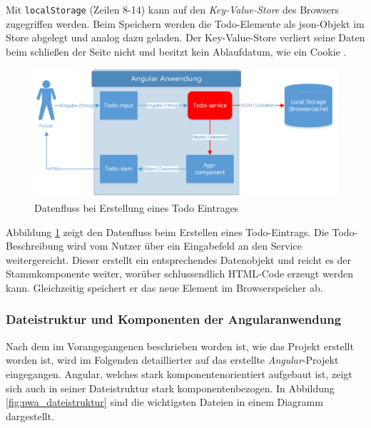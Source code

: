 Mit \texttt{localStorage} (Zeilen 8-14) kann auf den\textit{ Key-Value-Store} des Browsers zugegriffen werden. Beim Speichern werden die Todo-Elemente als \ac{json}-Objekt im Store abgelegt und analog dazu geladen. Der Key-Value-Store verliert seine Daten beim schließen der Seite nicht und besitzt kein Ablaufdatum, wie ein Cookie \cite{LocalStorage}.

\begin{figure}[h]
	\includegraphics[width=\textwidth]{img/pwa_datenfluss_erstellen.png}
	\centering
	\caption{Datenfluss bei Erstellung eines Todo Eintrages}
	\label{fig:pwa_datenfluss_erstellen}
\end{figure}

Abbildung \ref{fig:pwa_datenfluss_erstellen} zeigt den Datenfluss beim Erstellen eines Todo-Eintrags. Die Todo-Beschreibung wird vom Nutzer über ein Eingabefeld an den Service weitergereicht. Dieser erstellt ein entsprechendes Datenobjekt und reicht es der Stammkomponente weiter, worüber schlussendlich HTML-Code erzeugt werden kann. Gleichzeitig speichert er das neue Element im Browserspeicher ab.

\subsubsection{Dateistruktur und Komponenten der Angularanwendung}
Nach dem im Vorangegangenen beschrieben worden ist, wie das Projekt erstellt worden ist, wird im Folgenden detaillierter auf das erstellte \textit{Angular}-Projekt eingegangen. Angular, welches stark komponentenorientiert aufgebaut ist, zeigt sich auch in seiner Dateistruktur stark komponentenbezogen. In Abbildung \ref{fig:pwa_dateistruktur} sind die wichtigsten Dateien in einem Diagramm dargestellt.

